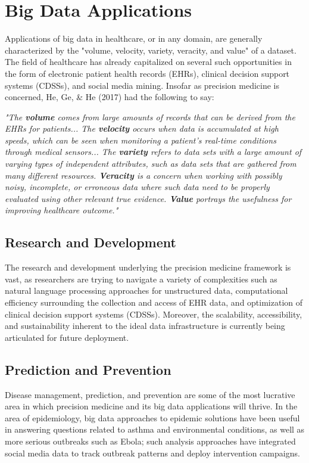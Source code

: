 \section{Big Data Applications}
Applications of big data in healthcare, or in any domain, are generally characterized by the "volume, velocity, variety, veracity, and value" of a dataset\cite{Jagadish2014}. The field of healthcare has already capitalized on several such opportunities in the form of electronic patient health records (EHRs), clinical decision support systems (CDSSs), and social media mining. Insofar as precision medicine is concerned, He, Ge, \& He (2017) had the following to say:

\textit{"The \textbf{volume} comes from large amounts of records that can be derived from the EHRs for patients... The \textbf{velocity} occurs when data is accumulated at high speeds, which can be seen when monitoring a patient’s real-time conditions through medical sensors... The \textbf{variety} refers to data sets with a large amount of varying types of independent attributes, such as data sets that are gathered from many different resources. \textbf{Veracity} is a concern when working with possibly noisy, incomplete, or erroneous data where such data need to be properly evaluated using other relevant true evidence. \textbf{Value} portrays the usefulness for improving healthcare outcome."}\cite{He2017}

\subsection{Research and Development}
The research and development underlying the precision medicine framework is vast, as researchers are trying to navigate a variety of complexities such as natural language processing approaches for unstructured data, computational efficiency surrounding the collection and access of EHR data, and optimization of clinical decision support systems (CDSSs). Moreover, the scalability, accessibility, and sustainability inherent to the ideal data infrastructure is currently being articulated for future deployment\cite{He2017}.

\subsection{Prediction and Prevention}
Disease management, prediction, and prevention are some of the most lucrative area in which precision medicine and its big data applications will thrive. In the area of epidemiology, big data approaches to epidemic solutions have been useful in answering questions related to asthma and environmental conditions, as well as more serious outbreaks such as Ebola; such analysis approaches have integrated social media data to track outbreak patterns and deploy intervention campaigns\cite{Leff2015}. 

